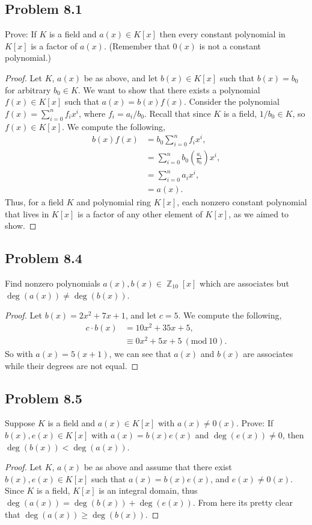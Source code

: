 \documentclass[letterpaper, 12pt]{amsart}
\DeclareMathOperator{\Z}{\mathbb{Z}}
\renewcommand{\mod}[1]{\ (\mathrm{mod}\ #1)}
\begin{document}
		\subsection*{Problem 8.1}
		\label{sub:problem_8_1}
		Prove: If $K$ is a field and $a(x) \in K[x]$ then every constant polynomial in $K[x]$ is a factor of $a(x)$. 
		(Remember that $0(x)$ is not a constant polynomial.)
			\begin{proof}
			Let $K$, $a(x)$ be as above, and let $b(x) \in K[x]$ such that $b(x) = b_{0}$ for arbitrary $b_{0} \in K$.
			We want to show that there exists a polynomial $f(x) \in K[x]$ such that $a(x) = b(x)f(x)$.
			Consider the polynomial $f(x) = \sum_{i=0}^{n} f_{i}x^{i}$, where $f_{i} = a_{i}/b_{0}$.
			Recall that since $K$ is a field, $1/b_{0} \in K$, so $f(x) \in K[x]$.
			We compute the following,
				\begin{align*}
				b(x)f(x) &= b_{0}\sum\limits_{i=0}^{n} f_{i}x^{i}, \\
				&= \sum\limits_{i=0}^{n} b_{0}\left( \frac{a_{i}}{b_{0}} \right)x^{i}, \\
				&= \sum\limits_{i=0}^{n} a_{i}x^{i}, \\
				&= a(x).
				\end{align*}
			Thus, for a field $K$ and polynomial ring $K[x]$, each nonzero constant polynomial that lives in $K[x]$ is a factor of any other element of $K[x]$, as we aimed to show.				
			\end{proof}

		\subsection*{Problem 8.4}
		\label{sub:problem_8_4}
		Find nonzero polynomials $a(x), b(x) \in \Z_{10}[x]$ which are associates but $\deg(a(x)) \neq \deg(b(x))$.
			\begin{proof}
			Let $b(x) = 2x^{2} + 7x + 1$, and let $c = 5$.
			We compute the following,
				\begin{align*}
				c \cdot b(x) &= 10x^{2} + 35x + 5, \\
				&\equiv 0x^{2} + 5x + 5 \mod{10}.
				\end{align*}
			So with $a(x) = 5(x+1)$, we can see that $a(x)$ and $b(x)$ are associates while their degrees are not equal.				
			\end{proof}

		\subsection*{Problem 8.5}
		\label{sub:problem_8_5}
		Suppose $K$ is a field and $a(x) \in K[x]$ with $a(x) \neq 0(x)$. 
		Prove: If $b(x), e(x) \in K[x]$ with $a(x) = b(x)e(x)$ and $\deg(e(x)) \neq 0$, then $\deg(b(x)) < \deg(a(x))$.
			\begin{proof}
			Let $K$, $a(x)$ be as above and assume that there exist $b(x), e(x) \in K[x]$ such that $a(x) = b(x)e(x)$, and $e(x) \neq 0(x)$.
			Since $K$ is a field, $K[x]$ is an integral domain, thus $\deg(a(x)) = \deg(b(x)) + \deg(e(x))$.
			From here its pretty clear that $\deg(a(x)) \geq \deg(b(x))$.
			\end{proof}
\end{document}
